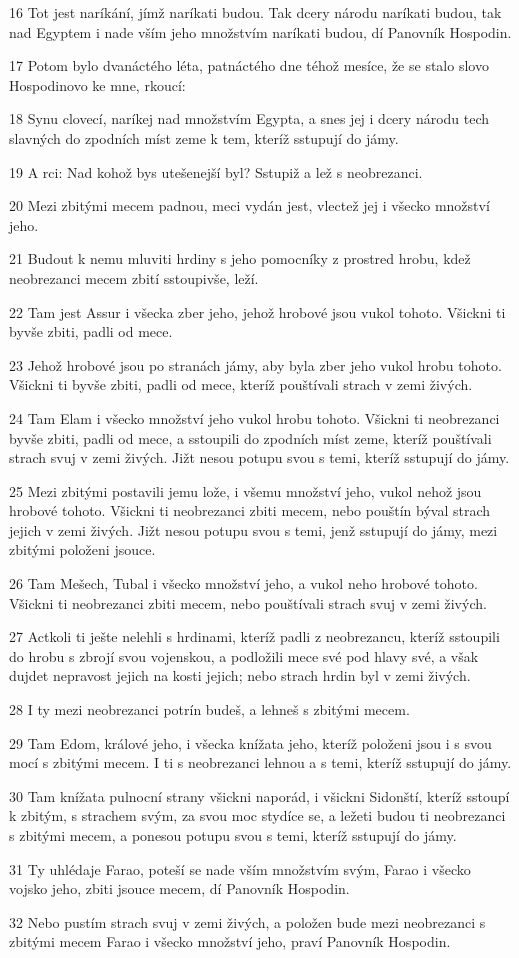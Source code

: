 \par 16 Tot jest naríkání, jímž naríkati budou. Tak dcery národu naríkati budou, tak nad Egyptem i nade vším jeho množstvím naríkati budou, dí Panovník Hospodin.
\par 17 Potom bylo dvanáctého léta, patnáctého dne téhož mesíce, že se stalo slovo Hospodinovo ke mne, rkoucí:
\par 18 Synu clovecí, naríkej nad množstvím Egypta, a snes jej i dcery národu tech slavných do zpodních míst zeme k tem, kteríž sstupují do jámy.
\par 19 A rci: Nad kohož bys utešenejší byl? Sstupiž a lež s neobrezanci.
\par 20 Mezi zbitými mecem padnou, meci vydán jest, vlectež jej i všecko množství jeho.
\par 21 Budout k nemu mluviti hrdiny s jeho pomocníky z prostred hrobu, kdež neobrezanci mecem zbití sstoupivše, leží.
\par 22 Tam jest Assur i všecka zber jeho, jehož hrobové jsou vukol tohoto. Všickni ti byvše zbiti, padli od mece.
\par 23 Jehož hrobové jsou po stranách jámy, aby byla zber jeho vukol hrobu tohoto. Všickni ti byvše zbiti, padli od mece, kteríž pouštívali strach v zemi živých.
\par 24 Tam Elam i všecko množství jeho vukol hrobu tohoto. Všickni ti neobrezanci byvše zbiti, padli od mece, a sstoupili do zpodních míst zeme, kteríž pouštívali strach svuj v zemi živých. Jižt nesou potupu svou s temi, kteríž sstupují do jámy.
\par 25 Mezi zbitými postavili jemu lože, i všemu množství jeho, vukol nehož jsou hrobové tohoto. Všickni ti neobrezanci zbiti mecem, nebo pouštín býval strach jejich v zemi živých. Jižt nesou potupu svou s temi, jenž sstupují do jámy, mezi zbitými položeni jsouce.
\par 26 Tam Mešech, Tubal i všecko množství jeho, a vukol neho hrobové tohoto. Všickni ti neobrezanci zbiti mecem, nebo pouštívali strach svuj v zemi živých.
\par 27 Actkoli ti ješte nelehli s hrdinami, kteríž padli z neobrezancu, kteríž sstoupili do hrobu s zbrojí svou vojenskou, a podložili mece své pod hlavy své, a však dujdet nepravost jejich na kosti jejich; nebo strach hrdin byl v zemi živých.
\par 28 I ty mezi neobrezanci potrín budeš, a lehneš s zbitými mecem.
\par 29 Tam Edom, králové jeho, i všecka knížata jeho, kteríž položeni jsou i s svou mocí s zbitými mecem. I ti s neobrezanci lehnou a s temi, kteríž sstupují do jámy.
\par 30 Tam knížata pulnocní strany všickni naporád, i všickni Sidonští, kteríž sstoupí k zbitým, s strachem svým, za svou moc stydíce se, a ležeti budou ti neobrezanci s zbitými mecem, a ponesou potupu svou s temi, kteríž sstupují do jámy.
\par 31 Ty uhlédaje Farao, poteší se nade vším množstvím svým, Farao i všecko vojsko jeho, zbiti jsouce mecem, dí Panovník Hospodin.
\par 32 Nebo pustím strach svuj v zemi živých, a položen bude mezi neobrezanci s zbitými mecem Farao i všecko množství jeho, praví Panovník Hospodin.


